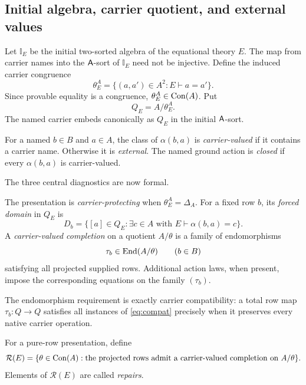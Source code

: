 \subsection{Initial algebra, carrier quotient, and external values}

Let $\mathbb I_E$ be the initial two-sorted algebra of the equational theory $E$.  The map from carrier names into the $\mathsf{A}$-sort of $\mathbb I_E$ need not be injective.  Define the induced carrier congruence
\begin{equation}\label{eq:thetaE}
\theta_E^A
=
\{(a,a')\in A^2:E\vdash a=a'\}.
\end{equation}
Since provable equality is a congruence, $\theta_E^A\in\operatorname{Con}(A)$.  Put
\[
Q_E=A/\theta_E^A.
\]
The named carrier embeds canonically as $Q_E$ in the initial $\mathsf{A}$-sort.

\begin{definition}
For a named $b\in B$ and $a\in A$, the class of $\alpha(b,a)$ is \emph{carrier-valued} if it contains a carrier name.  Otherwise it is \emph{external}.  The named ground action is \emph{closed} if every $\alpha(b,a)$ is carrier-valued.
\end{definition}

The three central diagnostics are now formal.

\begin{definition}
The presentation is \emph{carrier-protecting} when $\theta_E^A=\Delta_A$.  For a fixed row $b$, its \emph{forced domain} in $Q_E$ is
\[
D_b=
\{[a]\in Q_E:\exists c\in A\text{ with }E\vdash\alpha(b,a)=c\}.
\]
A \emph{carrier-valued completion} on a quotient $A/\theta$ is a family of endomorphisms
\[
\tau_b\in\operatorname{End}(A/\theta)\qquad(b\in B)
\]
satisfying all projected supplied rows.  Additional action laws, when present, impose the corresponding equations on the family $(\tau_b)$.
\end{definition}

The endomorphism requirement is exactly carrier compatibility: a total row map $\tau_b:Q\to Q$ satisfies all instances of \eqref{eq:compat} precisely when it preserves every native carrier operation.

\begin{definition}
For a pure-row presentation, define
\begin{equation}\label{eq:repairset}
\mathcal R(E)=
\{\theta\in\operatorname{Con}(A):\text{the projected rows admit a carrier-valued completion on }A/\theta\}.
\end{equation}
Elements of $\mathcal R(E)$ are called \emph{repairs}.
\end{definition}


